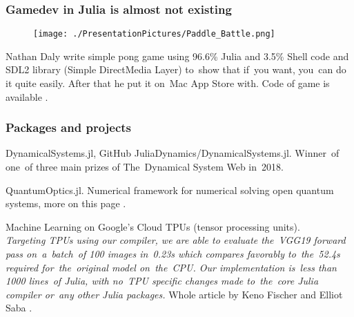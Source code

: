 \documentclass[10pt,t]{beamer}
\begin{document}
\begin{frame}
  \frametitle{Gamedev in Julia is almost not existing}


  \begin{figure}

    \centering

    \texttt{[image: ./PresentationPictures/Paddle\_Battle.png]}

  \end{figure}


  Nathan Daly write simple pong game using 96.6\% Julia and 3.5\%
  Shell code and SDL2 library (Simple DirectMedia Layer) to~show that
  if~you want, you~can do it quite easily. After that he put it on~Mac
  App Store with. Code of game is available
  .

\end{frame}





\begin{frame}
  \frametitle{Packages and projects}


  DynamicalSystems.jl, GitHub
  {JuliaDynamics/DynamicalSystems.jl}. Winner~of one~of three main
  prizes of The~Dynamical System Web in~2018.

  \vspace{0.3em}



  QuantumOptics.jl. Numerical framework for numerical solving open
  quantum systems, more on this page
  .

  \vspace{0.3em}



  Machine Learning on Google's Cloud TPUs (tensor processing
  units). \\
  \textit{Targeting TPUs using our compiler, we are able to evaluate
    the~VGG19 forward pass on~a~batch~of 100 images in~0.23s which
    compares favorably to~the~52.4s required for~the~original model
    on~the~CPU. Our implementation is~less than 1000 lines~of Julia,
    with no~TPU specific changes made to~the~core Julia compiler
    or~any other Julia packages.} Whole article by Keno Fischer and
  Elliot Saba .

\end{frame}
\end{document}
